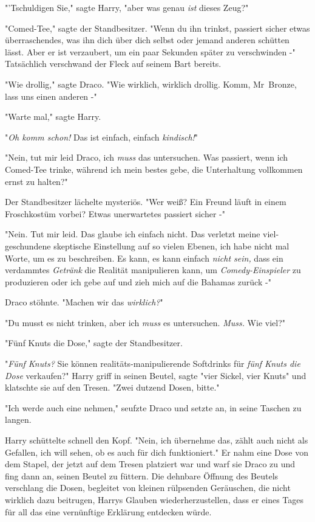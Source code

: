 {"'Tschuldigen Sie," sagte Harry, "aber was genau \emph{ist} dieses Zeug?"

"Comed-Tee," sagte der Standbesitzer. "Wenn du ihn trinkst, passiert sicher etwas überraschendes, was ihn dich über dich selbst oder jemand anderen schütten lässt. Aber er ist verzaubert, um ein paar Sekunden später zu verschwinden -" Tatsächlich verschwand der Fleck auf seinem Bart bereits.

"Wie drollig," sagte Draco. "Wie wirklich, wirklich drollig. Komm, Mr~Bronze, lass uns einen anderen -"

"Warte mal," sagte Harry.

"\emph{Oh komm schon!} Das ist einfach, einfach \emph{kindisch!}"

"Nein, tut mir leid Draco, ich \emph{muss} das untersuchen. Was passiert, wenn ich Comed-Tee trinke, während ich mein bestes gebe, die Unterhaltung vollkommen ernst zu halten?"

Der Standbesitzer lächelte mysteriös. "Wer weiß? Ein Freund läuft in einem Froschkostüm vorbei? Etwas unerwartetes passiert sicher -"

"Nein. Tut mir leid. Das glaube ich einfach nicht. Das verletzt meine viel-geschundene skeptische Einstellung auf so vielen Ebenen, ich habe nicht mal Worte, um es zu beschreiben. Es kann, es kann einfach \emph{nicht sein,} dass ein verdammtes \emph{Getränk} die Realität manipulieren kann, um \emph{Comedy-Einspieler} zu produzieren oder ich gebe auf und zieh mich auf die Bahamas zurück -"

Draco stöhnte. "Machen wir das \emph{wirklich?}"

"Du musst es nicht trinken, aber ich \emph{muss} es untersuchen. \emph{Muss.} Wie viel?"

"Fünf Knuts die Dose," sagte der Standbesitzer.

"\emph{Fünf Knuts?} Sie können realitäts-manipulierende Softdrinks für \emph{fünf Knuts die Dose} verkaufen?" Harry griff in seinen Beutel, sagte "vier Sickel, vier Knuts" und klatschte sie auf den Tresen. "Zwei dutzend Dosen, bitte."

"Ich werde auch eine nehmen," seufzte Draco und setzte an, in seine Taschen zu langen.

Harry schüttelte schnell den Kopf. "Nein, ich übernehme das, zählt auch nicht als Gefallen, ich will sehen, ob es auch für dich funktioniert." Er nahm eine Dose von dem Stapel, der jetzt auf dem Tresen platziert war und warf sie Draco zu und fing dann an, seinen Beutel zu füttern. Die dehnbare Öffnung des Beutels verschlang die Dosen, begleitet von kleinen rülpsenden Geräuschen, die nicht wirklich dazu beitrugen, Harrys Glauben wiederherzustellen, dass er eines Tages für all das eine vernünftige Erklärung entdecken würde.

}
